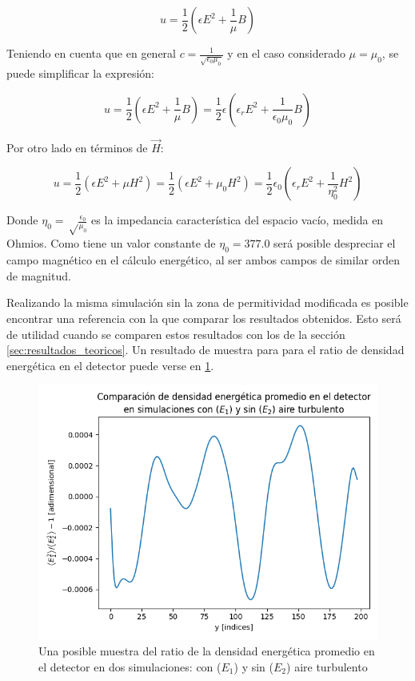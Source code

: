 \begin{equation}
    u = \frac{1}{2} \left(\epsilon E^2 + \frac{1}{\mu} B\right)
\end{equation}

Teniendo en cuenta que en general $c = \frac{1}{\sqrt{\epsilon_0 \mu_0}}$ y en el caso considerado $\mu = \mu_0$, se puede simplificar la expresión:

\begin{equation}
    u = \frac{1}{2} \left(\epsilon E^2 + \frac{1}{\mu} B\right) = \frac{1}{2} \epsilon \left(\epsilon_r E^2 + \frac{1}{\epsilon_0\mu_0} B\right) 
\end{equation}

Por otro lado en términos de $\vec H$:

\begin{equation}
    u = \frac{1}{2} \left(\epsilon E^2 + \mu H^2 \right) = \frac{1}{2} \left(\epsilon E^2 + \mu_0 H^2 \right) = \frac{1}{2} \epsilon_0 \left(\epsilon_r E^2 +  \frac{1}{\eta^2_0} H^2 \right)
\end{equation}

Donde $\eta_0 = \sqrt \frac{\epsilon_0}{\mu_0}$ es la impedancia característica del espacio vacío, medida en Ohmios. Como tiene un valor constante de $\eta_0 = 377.0$ será posible despreciar el campo magnético en el cálculo energético, al ser ambos campos de similar orden de magnitud.

Realizando la misma simulación sin la zona de permitividad modificada es posible encontrar una referencia con la que comparar los resultados obtenidos. Esto será de utilidad cuando se comparen estos resultados con los de la sección \ref{sec:resultados_teoricos}. Un resultado de muestra para para el ratio de densidad energética en el detector puede verse en \ref{fig:comparacion_2d}. 

\begin{figure}
    \centering
    \includegraphics[width=0.7\linewidth]{figures/comparacion_2d.png}
    \caption{Una posible muestra del ratio de la densidad energética promedio en el detector en dos simulaciones: con ($E_1$) y sin ($E_2$) aire turbulento}
    \label{fig:comparacion_2d}
\end{figure}

